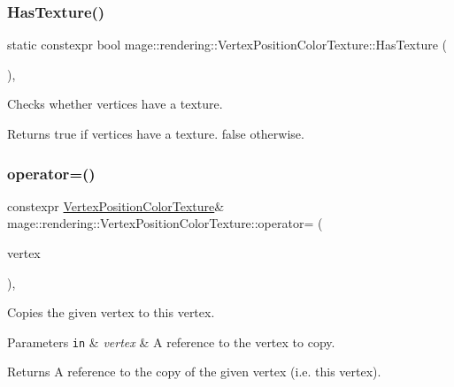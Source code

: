 \subsubsection{\texorpdfstring{Has\+Texture()}{HasTexture()}}
{\footnotesize\ttfamily static constexpr bool mage\+::rendering\+::\+Vertex\+Position\+Color\+Texture\+::\+Has\+Texture (\begin{DoxyParamCaption}{ }\end{DoxyParamCaption})\hspace{0.3cm}{\ttfamily [static]}, {\ttfamily [noexcept]}}

Checks whether vertices have a texture.

\begin{DoxyReturn}{Returns}
{\ttfamily true} if vertices have a texture. {\ttfamily false} otherwise. 
\end{DoxyReturn}
\hypertarget{structmage_1_1rendering_1_1_vertex_position_color_texture_a8bb4077a1a8a1c838936157446d553af}{}\label{structmage_1_1rendering_1_1_vertex_position_color_texture_a8bb4077a1a8a1c838936157446d553af} 
\subsubsection{\texorpdfstring{operator=()}{operator=()}\hspace{0.1cm}{\footnotesize\ttfamily [1/2]}}
{\footnotesize\ttfamily constexpr \hyperlink{structmage_1_1rendering_1_1_vertex_position_color_texture}{Vertex\+Position\+Color\+Texture}\& mage\+::rendering\+::\+Vertex\+Position\+Color\+Texture\+::operator= (\begin{DoxyParamCaption}\item[{const \hyperlink{structmage_1_1rendering_1_1_vertex_position_color_texture}{Vertex\+Position\+Color\+Texture} \&}]{vertex }\end{DoxyParamCaption})\hspace{0.3cm}{\ttfamily [default]}, {\ttfamily [noexcept]}}

Copies the given vertex to this vertex.


\begin{DoxyParams}[1]{Parameters}
\mbox{\tt in}  & {\em vertex} & A reference to the vertex to copy. \\
\hline
\end{DoxyParams}
\begin{DoxyReturn}{Returns}
A reference to the copy of the given vertex (i.\+e. this vertex). 
\end{DoxyReturn}
\hypertarget{structmage_1_1rendering_1_1_vertex_position_color_texture_ad750863d48aee99752e84d37c50020ce}{}\label{structmage_1_1rendering_1_1_vertex_position_color_texture_ad750863d48aee99752e84d37c50020ce} 
